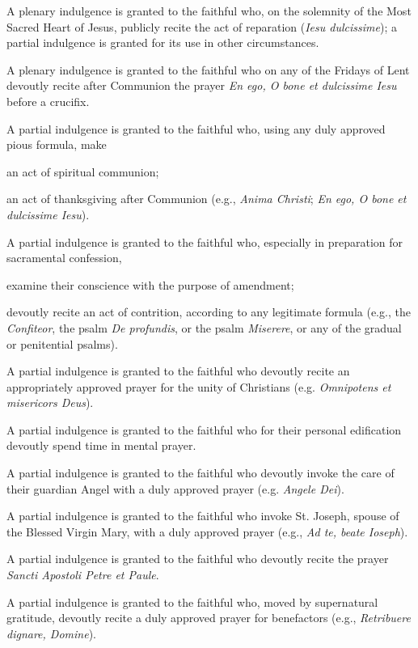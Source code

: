 \documentclass[12pt]{article}
\newcommand{\foreign}[1]{\textsl{#1}}
\begin{document}
\hypertarget{grant3}{}
A plenary indulgence is granted to the faithful who, on the solemnity of the Most Sacred Heart of Jesus, publicly recite the act of reparation (\foreign{Iesu dulcissime}); a partial indulgence is granted for its use in other circumstances.

\hypertarget{grant8}{}

 A plenary indulgence is granted to the faithful who  on any of the Fridays of Lent devoutly recite after Communion the prayer \foreign{En ego, O bone et dulcissime Iesu} before a crucifix.

 A partial indulgence is granted to the faithful who, using any duly approved pious formula, make

 an act of spiritual communion;

 an act of thanksgiving after Communion (e.g., \foreign{Anima Christi}; \foreign{En ego, O bone et dulcissime Iesu}).

\hypertarget{grant9}{}
A partial indulgence is granted to the faithful who, especially in preparation for sacramental confession,

 examine their conscience with the purpose of amendment;

 devoutly recite an act of contrition, according to any legitimate formula (e.g., the \foreign{Confiteor}, the psalm \foreign{De profundis}, or the psalm \foreign{Miserere}, or any of the gradual or penitential psalms).

\hypertarget{grant11}{}
 A partial indulgence is granted to the faithful who devoutly recite an appropriately approved prayer for the unity of Christians (e.g. \foreign{Omnipotens et misericors Deus}).

A partial indulgence is granted to the faithful who for their personal edification devoutly spend time in mental prayer.

\hypertarget{grant18}{}
A partial indulgence is granted to the faithful who devoutly invoke the care of their guardian Angel with a duly approved prayer (e.g. \foreign{Angele Dei}).

\hypertarget{grant19}{}
A partial indulgence is granted to the faithful who invoke St. Joseph, spouse of the Blessed Virgin Mary, with a duly approved prayer (e.g., \foreign{Ad te, beate Ioseph}).

\hypertarget{grant20}{}
A partial indulgence is granted to the faithful who devoutly recite the prayer \foreign{Sancti Apostoli Petre et Paule}.

\hypertarget{grant24}{}
A partial indulgence is granted to the faithful who, moved by supernatural gratitude, devoutly recite a duly approved prayer for benefactors (e.g., \foreign{Retribuere dignare, Domine}).
\end{document}
